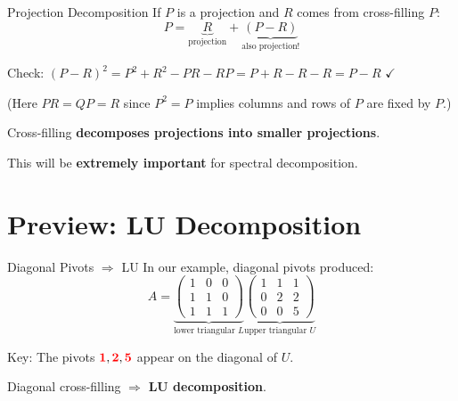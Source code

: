 \documentclass[10pt]{beamer}
\theoremstyle{definition}
\newcommand{\pvt}[1]{{\color{red}\mathbf{#1}}}       %
\newcommand{\x}[1]{\alert{\textbf{#1}}}
\begin{document}
\begin{frame}{Projection Decomposition}
If $P$ is a projection and $R$ comes from cross-filling $P$:
$$P = \underbrace{R}_{\text{projection}} + \underbrace{(P-R)}_{\text{also projection!}}$$

\vfill
Check: $(P-R)^2 = P^2 + R^2 - PR - RP = P + R - R - R = P - R$ \quad $\checkmark$

\vfill
(Here $PR = QP = R$ since $P^2 = P$ implies columns and rows of $P$ are fixed by $P$.)

\vfill
Cross-filling \x{decomposes projections into smaller projections}.

This will be \x{extremely important} for spectral decomposition.
\end{frame}

\section{Preview: LU Decomposition}

\begin{frame}{Diagonal Pivots $\Rightarrow$ LU}
In our example, diagonal pivots produced:
$$A = \underbrace{\begin{pmatrix}
1 & 0 & 0 \\
1 & 1 & 0 \\
1 & 1 & 1
\end{pmatrix}}_{\text{lower triangular } L}
\underbrace{\begin{pmatrix}
1 & 1 & 1 \\
0 & 2 & 2 \\
0 & 0 & 5
\end{pmatrix}}_{\text{upper triangular } U}$$

\vfill
Key: The pivots $\pvt{1}, \pvt{2}, \pvt{5}$ appear on the diagonal of $U$.

\vfill
Diagonal cross-filling $\Longrightarrow$ \x{LU decomposition}.
\end{frame}
\end{document}
